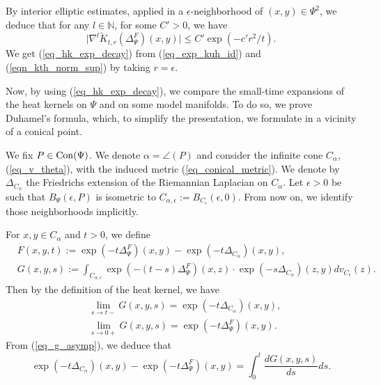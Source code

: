 \documentclass[12pt]{article}
\numberwithin{equation}{section}
\theoremstyle{theorem}
\theoremstyle{definition}
\theoremstyle{remark}
\newcommand{\nat}{\mathbb{N}}
\newcommand{\laplcomp}{\Delta}
\begin{document}
	By interior elliptic estimates, applied in a $\epsilon$-neighborhood of $(x, y) \in \Psi^2$, we deduce that for any $l \in \nat$, for some $C' > 0$, we have
	\begin{equation} \label{eqn_kth_norm_sup}
	\Big|  \nabla^l \widetilde{K}_{t, r}( \laplcomp_{\Psi}^{F} ) (x, y) \Big|
		\leq
		C' \exp ( - c' r^2/ t).
	\end{equation}
	We get (\ref{eq_hk_exp_decay}) from (\ref{eq_exp_kuh_id}) and (\ref{eqn_kth_norm_sup}) by taking $r = \epsilon$.
	\par 
	Now, by using (\ref{eq_hk_exp_decay}), we compare the small-time expansions of the heat kernels on $\Psi$ and on some model manifolds.
	To do so, we prove Duhamel's formula, which, to simplify the presentation, we formulate in a vicinity of a conical point.
	\par 
	We fix $P \in {\rm{Con}}(\Psi)$. We denote $\alpha = \angle(P)$ and consider the infinite cone $C_{\alpha}$, (\ref{eq_v_theta}), with the induced metric (\ref{eq_conical_metric}).
	We denote by $\laplcomp_{C_{\alpha}}$ the Friedrichs extension of the Riemannian Laplacian on $C_{\alpha}$.
	Let $\epsilon > 0$ be such that $B_{\Psi}(\epsilon, P)$ is isometric to  $C_{\alpha, \epsilon} := B_{C_{\epsilon}}(\epsilon, 0)$. 
	From now on, we identify those neighborhoods implicitly.
	\par 
	For $x, y \in C_{\alpha}$ and $t > 0$, we define
	\begin{equation}\label{eq_fg_defn}
	\begin{aligned}
		&F(x, y, t) := \exp(- t \laplcomp_{\Psi}^{F})(x, y) - \exp(- t \laplcomp_{C_{\alpha}})(x, y), 
		\\
		&G(x, y, s) := \int_{C_{\alpha, \epsilon}} \exp(- (t-s) \laplcomp_{\Psi}^{F})(x, z) \cdot \exp(- s \laplcomp_{C_{\alpha}})(z, y) dv_{C_{\epsilon}}(z).
	\end{aligned}
	\end{equation}
	Then by the definition of the heat kernel, we have
	\begin{equation}\label{eq_g_asymp}
	\begin{aligned}
		& \lim_{s \to t-} G(x, y, s)  = \exp(- t \laplcomp_{C_{\alpha}})(x, y), 
		\\
		& \lim_{s \to 0+} G(x, y, s)  = \exp(- t \laplcomp_{\Psi}^{F})(x, y).
	\end{aligned}
	\end{equation}
	From (\ref{eq_g_asymp}), we deduce that 
	\begin{equation}\label{eq_hk_diff}
		\exp(- t \laplcomp_{C_{\alpha}})(x, y) -  \exp(- t \laplcomp_{\Psi}^{F})(x, y) = \int_{0}^{t} \frac{d G(x, y, s)}{ds}  ds.
	\end{equation}
\end{document}
